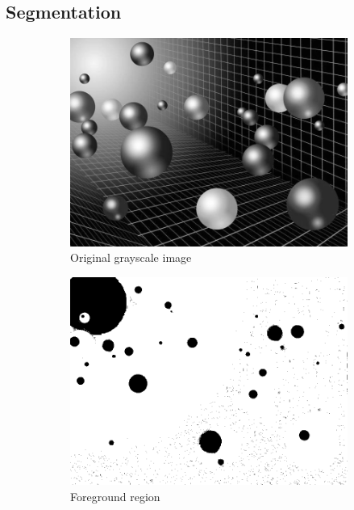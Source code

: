 \documentclass[a4paper,16pt]{article}
\begin{document}
	\subsection{Segmentation}
	\vspace{0.2in}
	
	\vspace{0.8in}
	\begin{figure}[h!]
		\begin{subfigure}[h!]{0.45\linewidth}
			\includegraphics[width=\linewidth]{ballg}
			\caption{Original grayscale image}
		\end{subfigure}
		\hfill
		\begin{subfigure}[h!]{0.45\linewidth}
			\includegraphics[width=\linewidth]{ballth}
			\caption{Foreground region}
		\end{subfigure}
		\hfill
		\centering
		\begin{subfigure}[h!]{0.45\linewidth}
			

\end{subfigure}
\end{figure}
\end{document}
